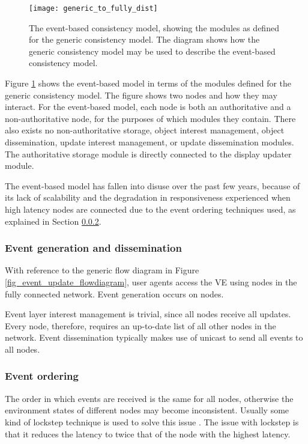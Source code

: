 \begin{figure}[htbp]
 \centering
 \texttt{[image: generic\_to\_fully\_dist]}
 \caption{The event-based consistency model, showing the modules as defined for the generic consistency model. The diagram shows how the generic consistency model may be used to describe the event-based consistency model.}
 \label{fig_generic_to_fully_dist}
\end{figure}
%
Figure \ref{fig_generic_to_fully_dist} shows the event-based model in terms of the modules defined for the generic consistency model. The figure shows two nodes and how they may interact. For the event-based model, each node is both an authoritative and a non-authoritative node, for the purposes of which modules they contain. There also exists no non-authoritative storage, object interest management, object dissemination, update interest management, or update dissemination modules. The authoritative storage module is directly connected to the display updater module.

The event-based model has fallen into disuse over the past few years, because of its lack of scalability and the degradation in responsiveness experienced when high latency nodes are connected due to the event ordering techniques used, as explained in Section \ref{event_based_event_ordering}.

\subsubsection{Event generation and dissemination}

With reference to the generic flow diagram in Figure \ref{fig_event_update_flowdiagram}, user agents access the VE using nodes in the fully connected network. Event generation occurs on nodes.

Event layer interest management is trivial, since all nodes receive all updates. Every node, therefore, requires an up-to-date list of all other nodes in the network. Event dissemination typically makes use of unicast to send all events to all nodes.

\subsubsection{Event ordering}
\label{event_based_event_ordering}

The order in which events are received is the same for all nodes, otherwise the environment states of different nodes may become inconsistent.
Usually some kind of lockstep technique is used to solve this issue \cite{pessimistic_lock_step}. The issue with lockstep is that it reduces the latency to twice that of the node with the highest latency.


